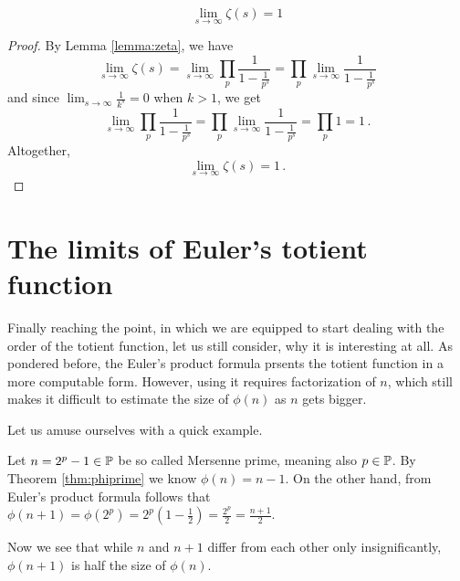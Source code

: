 \documentclass{article}
\begin{document}
\begin{lemma}
\label{lemma:zetalim}
\begin{equation*}
    \lim_{s\rightarrow\infty} \zeta(s) = 1
\end{equation*}

\begin{proof}
By Lemma \ref{lemma:zeta}, we have
\begin{equation*}
    \lim_{s\rightarrow\infty} \zeta(s) = \lim_{s\rightarrow\infty} \prod_p \frac{1}{1-\frac{1}{p^s}} = \prod_p \lim_{s\rightarrow\infty} \frac{1}{1-\frac{1}{p^s}}
\end{equation*}
and since $\lim_{s\rightarrow\infty}\frac{1}{k^s}=0$ when $k>1$, we get
\begin{equation*}
    \lim_{s\rightarrow\infty} \prod_p \frac{1}{1-\frac{1}{p^s}} = \prod_p \lim_{s\rightarrow\infty} \frac{1}{1-\frac{1}{p^s}} = \prod_p 1 = 1\,.
\end{equation*}
Altogether,
\begin{equation*}
    \lim_{s\rightarrow\infty} \zeta(s) = 1\,.
\end{equation*}
\end{proof}
\end{lemma}

\section{The limits of Euler's totient function}

Finally reaching the point, in which we are equipped to start dealing with the order of the totient function, let us still consider, why it is interesting at all. As pondered before, the Euler's product formula prsents the totient function in a more computable form. However, using it requires factorization of $n$, which still makes it difficult to estimate the size of $\phi(n)$ as $n$ gets bigger.

Let us amuse ourselves with a quick example.

\begin{example}
\emph{\cite{Pomerance}} Let $n = 2^p - 1 \in \mathbb{P}$ be so called Mersenne prime, meaning also $p \in \mathbb{P}$. By Theorem \ref{thm:phiprime} we know $\phi(n) = n - 1$. On the other hand, from Euler's product formula follows that $\phi(n+1) = \phi(2^p) = 2^p(1-\frac{1}{2}) = \frac{2^p}{2} = \frac{n+1}{2}$.

Now we see that while $n$ and $n+1$ differ from each other only insignificantly, $\phi(n+1)$ is half the size of $\phi(n)$.
\end{example}
\end{document}
